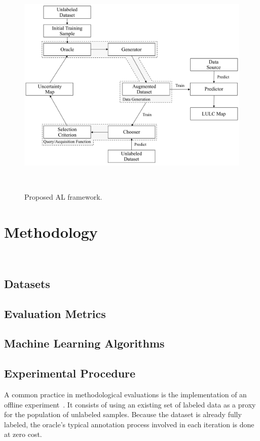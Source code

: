 \documentclass[parskip=full]{scrartcl}
\begin{document}
\begin{figure}[H]
	\centering
	\includegraphics[width=.85\linewidth]{../analysis/al_new}
	\caption{Proposed AL framework.
    }~\label{fig:al_new}
\end{figure}

\section{Methodology}~\label{sec:methodology}

\subsection{Datasets}

\subsection{Evaluation Metrics}

\subsection{Machine Learning Algorithms}

\subsection{Experimental Procedure}

A common practice in methodological evaluations is the implementation of an offline
experiment~\cite{Kagy2019}. It consists of using an existing set of labeled data as a proxy for the
population of unlabeled samples. Because the dataset is already fully labeled, the oracle's typical
annotation process involved in each iteration is done at zero cost.
\end{document}
